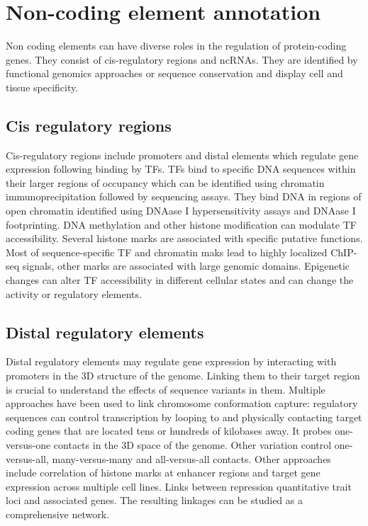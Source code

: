 \section{Non-coding element annotation}
Non coding elements can have diverse roles in the regulation of protein-coding genes.
They consist of cis-regulatory regions and ncRNAs.
They are identified by functional genomics approaches or sequence conservation and display cell and tissue specificity.

	\subsection{Cis regulatory regions}
	Cis-regulatory regions include promoters and distal elements which regulate gene expression following binding by TFs.
	TFs bind to specific DNA sequences within their larger regions of occupancy which can be identified using chromatin immunoprecipitation followed by sequencing assays.
	They bind DNA in regions of open chromatin identified using DNAase I hypersensitivity assays and DNAase I footprinting.
	DNA methylation and other histone modification can modulate TF accessibility.
	Several histone marks are associated with specific putative functions.
	Most of sequence-specific TF and chromatin maks lead to highly localized ChIP-seq signals, other marks are associated with large genomic domains.
	Epigenetic changes can alter TF accessibility in  different cellular states and can change the activity or regulatory elements.


	\subsection{Distal regulatory elements}
	Distal regulatory elements may regulate gene expression by interacting with promoters in the 3D structure of the genome.
	Linking them to their target region is crucial to understand the effects of sequence variants in them.
	Multiple approaches have been used to link chromosome conformation capture: regulatory sequences can control transcription by looping to and physically contacting target coding genes that are located tens or hundreds of kilobases away.
	It probes one-versus-one contacts in the 3D space of the genome.
	Other variation control one-versus-all, many-versus-many and all-versus-all contacts.
	Other approaches include correlation of histone marks at enhancer regions and target gene expression across multiple cell lines.
	Links between repression quantitative trait loci and associated genes.
	The resulting linkages can be studied as a comprehensive network.

